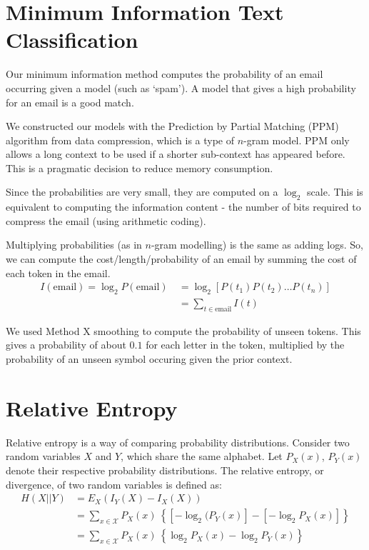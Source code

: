 \documentclass[a4]{article}
\begin{document}
\section{Minimum Information Text Classification}
Our minimum information method computes the probability of an email occurring
given a model (such as `spam').  A model that gives a high probability for
an email is a good match.

We constructed our models with the Prediction by Partial Matching (PPM)
algorithm from data compression, which is a type of $n$-gram model.  PPM only
allows a long context to be used if a shorter sub-context has appeared before.
This is a pragmatic decision to reduce memory consumption.

Since the probabilities are very small, they are computed on a $\log_2$
scale.  This is equivalent to computing the information content - the
number of bits required to compress the email (using arithmetic coding).

Multiplying probabilities (as in $n$-gram modelling) is the same as adding
logs.  So, we can compute the cost/length/probability of an email by summing
the cost of each token in the email.
\begin{align}
I(\text{email}) = \log_2 P(\text{email}) \
		&= \log_2 [P(t_1) P(t_2) \dots P(t_n)] \\
	&= \sum_{t \in \text{email}} I(t)
\end{align}

We used Method X smoothing to compute the probability of unseen tokens.
This gives a probability of about $0.1$ for each letter in the token,
multiplied by the probability of an unseen symbol occuring given the
prior context.
 
\section{Relative Entropy} 

Relative entropy is a way of comparing probability distributions.
Consider two random variables $X$ and $Y$, which share the same alphabet.
Let $P_X(x)$, $P_Y(x)$ denote their respective probability distributions.
The relative entropy, or divergence, of two random variables is defined as:   
\begin{align}
H(X||Y) &= E_X(I_Y(X) - I_X(X)) \\
	&= \sum_{x \in \mathcal{X}} P_X(x) \
		\left\{ [-\log_2(P_Y(x)] - [-\log_2 P_X(x)] \right\} \\
	&= \sum_{x \in \mathcal{X}} P_X(x) \
		\left\{ \log_2 P_X(x) - \log_2 P_Y(x) \right\}
\end{align}
\end{document}
